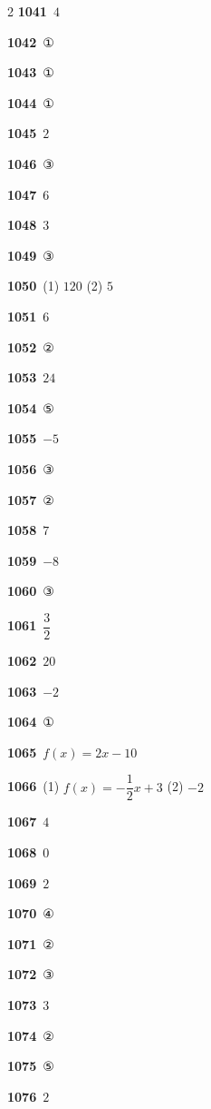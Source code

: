 \documentclass[10pt,a4paper]{article}
\begin{document}
\begin{multicols}{2}
\noindent\textbf{1041}\ $4$\par
\noindent\textbf{1042}\ ①\par
\noindent\textbf{1043}\ ①\par
\noindent\textbf{1044}\ ①\par
\noindent\textbf{1045}\ $2$\par
\noindent\textbf{1046}\ ③\par
\noindent\textbf{1047}\ $6$\par
\noindent\textbf{1048}\ $3$\par
\noindent\textbf{1049}\ ③\par
\noindent\textbf{1050}\ (1) $120$ (2) $5$\par
\noindent\textbf{1051}\ $6$\par
\noindent\textbf{1052}\ ②\par
\noindent\textbf{1053}\ $24$\par
\noindent\textbf{1054}\ ⑤\par
\noindent\textbf{1055}\ $-5$\par
\noindent\textbf{1056}\ ③\par
\noindent\textbf{1057}\ ②\par
\noindent\textbf{1058}\ $7$\par
\noindent\textbf{1059}\ $-8$\par
\noindent\textbf{1060}\ ③\par
\noindent\textbf{1061}\ $\dfrac{3}{2}$\par
\noindent\textbf{1062}\ $20$\par
\noindent\textbf{1063}\ $-2$\par
\noindent\textbf{1064}\ ①\par
\noindent\textbf{1065}\ $f(x)=2x-10$\par
\noindent\textbf{1066}\ (1) $f(x)=-\dfrac{1}{2}x+3$ (2) $-2$\par
\noindent\textbf{1067}\ $4$\par
\noindent\textbf{1068}\ $0$\par
\noindent\textbf{1069}\ $2$\par
\noindent\textbf{1070}\ ④\par
\noindent\textbf{1071}\ ②\par
\noindent\textbf{1072}\ ③\par
\noindent\textbf{1073}\ $3$\par
\noindent\textbf{1074}\ ②\par
\noindent\textbf{1075}\ ⑤\par
\noindent\textbf{1076}\ $2$\par

\end{multicols}
\end{document}
